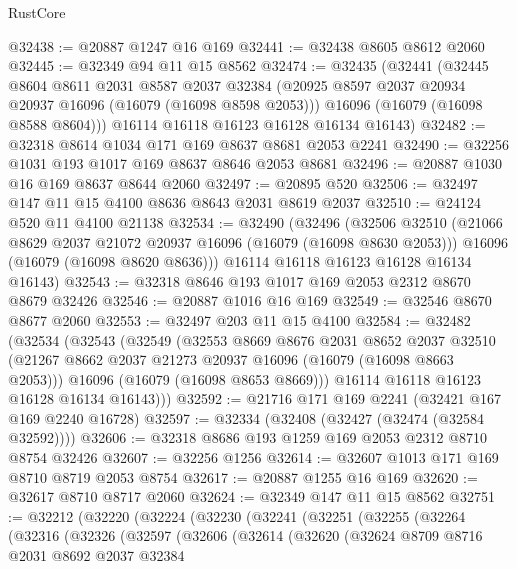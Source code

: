 \begin{lexlean}{RustCore}
\begin{coremodule}
@32438 := @20887 @1247 @16 @169
@32441 := @32438 @8605 @8612 @2060
@32445 := @32349 @94 @11 @15 @8562
@32474 := @32435
    (@32441
      (@32445
        @8604
        @8611
        @2031
        @8587
        @2037
        @32384
        (@20925 @8597 @2037 @20934 @20937 @16096 (@16079 (@16098 @8598 @2053)))
        @16096
        (@16079 (@16098 @8588 @8604)))
      @16114
      @16118
      @16123
      @16128
      @16134
      @16143)
@32482 := @32318 @8614 @1034 @171 @169 @8637 @8681 @2053 @2241
@32490 := @32256 @1031 @193 @1017 @169 @8637 @8646 @2053 @8681
@32496 := @20887 @1030 @16 @169 @8637 @8644 @2060
@32497 := @20895 @520
@32506 := @32497 @147 @11 @15 @4100 @8636 @8643 @2031 @8619 @2037
@32510 := @24124 @520 @11 @4100 @21138
@32534 := @32490
    (@32496
      (@32506
        @32510
        (@21066 @8629 @2037 @21072 @20937 @16096 (@16079 (@16098 @8630 @2053)))
        @16096
        (@16079 (@16098 @8620 @8636)))
      @16114
      @16118
      @16123
      @16128
      @16134
      @16143)
@32543 := @32318 @8646 @193 @1017 @169 @2053 @2312 @8670 @8679 @32426
@32546 := @20887 @1016 @16 @169
@32549 := @32546 @8670 @8677 @2060
@32553 := @32497 @203 @11 @15 @4100
@32584 := @32482
    (@32534
      (@32543
        (@32549
          (@32553
            @8669
            @8676
            @2031
            @8652
            @2037
            @32510
            (@21267 @8662 @2037 @21273 @20937 @16096 (@16079 (@16098 @8663 @2053)))
            @16096
            (@16079 (@16098 @8653 @8669)))
          @16114
          @16118
          @16123
          @16128
          @16134
          @16143)))
@32592 := @21716 @171 @169 @2241 (@32421 @167 @169 @2240 @16728)
@32597 := @32334 (@32408 (@32427 (@32474 (@32584 @32592))))
@32606 := @32318 @8686 @193 @1259 @169 @2053 @2312 @8710 @8754 @32426
@32607 := @32256 @1256
@32614 := @32607 @1013 @171 @169 @8710 @8719 @2053 @8754
@32617 := @20887 @1255 @16 @169
@32620 := @32617 @8710 @8717 @2060
@32624 := @32349 @147 @11 @15 @8562
@32751 := @32212
    (@32220
      (@32224
        (@32230
          (@32241
            (@32251
              (@32255
                (@32264
                  (@32316
                    (@32326
                      (@32597
                        (@32606
                          (@32614
                            (@32620
                              (@32624
                                @8709
                                @8716
                                @2031
                                @8692
                                @2037
                                @32384

\end{coremodule}
\end{lexlean}
